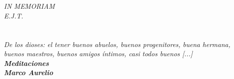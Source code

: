 \chapter*{}


\chapter*{}
\begin{flushright}
\large	\textit{IN MEMORIAM}\\
	\textit{E.J.T. }\\
\end{flushright}



\chapter*{}
\begin{flushright}
	\textit{ De los dioses: el tener buenos abuelos, buenos progenitores, buena hermana, buenos maestros, buenos amigos \'{i}ntimos, casi todos buenos [...]}\\
\vspace{1cm}
	\textbf{\textit{Meditaciones}\\
	\textit{Marco Aurelio}}\\
\end{flushright}